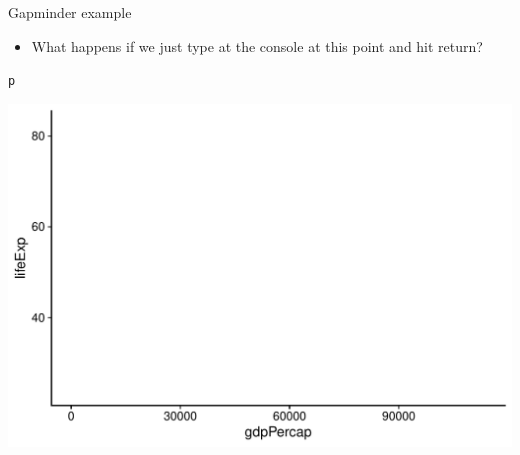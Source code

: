 \documentclass[10pt,handout]{beamer}\usepackage[]{graphicx}\usepackage[]{color}
\makeatletter
\def\maxwidth{ %
  \ifdim\Gin@nat@width>\linewidth
    \linewidth
  \else
    \Gin@nat@width
  \fi
}
\newcommand{\hlstd}[1]{\textcolor[rgb]{0.345,0.345,0.345}{#1}}%
\newenvironment{kframe}{%
 \def\at@end@of@kframe{}%
 \ifinner\ifhmode%
  \def\at@end@of@kframe{\end{minipage}}%
  \begin{minipage}{\columnwidth}%
 \fi\fi%
 \def\FrameCommand##1{\hskip\@totalleftmargin \hskip-\fboxsep
 \colorbox{shadecolor}{##1}\hskip-\fboxsep
     \hskip-\linewidth \hskip-\@totalleftmargin \hskip\columnwidth}%
 \MakeFramed {\advance\hsize-\width
   \@totalleftmargin\z@ \linewidth\hsize
   \@setminipage}}%
 {\par\unskip\endMakeFramed%
 \at@end@of@kframe}
\newenvironment{knitrout}{}{} %
\makeatother
\begin{document}
\begin{frame}[fragile]{Gapminder example}
	
	\begin{itemize}
		\item What happens if we just type  at the console at this point and hit return?
	\end{itemize}

\pause 
	
\begin{knitrout}\tiny
{}\color{fgcolor}\begin{kframe}
\begin{alltt}
\hlstd{p}
\end{alltt}
\end{kframe}

{\centering \includegraphics[width=\maxwidth]{figure/unnamed-chunk-5-1} 

}


\end{knitrout}
	
\end{frame}
\end{document}
